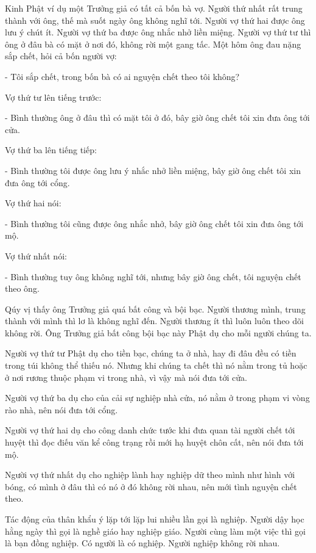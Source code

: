 \documentclass[
  12pt,
  oneside]{book}
\begin{document}
Kinh Phật ví dụ một Trưởng giả có tất cả bốn bà vợ. Người thứ nhất rất trung thành với ông, thế mà suốt ngày ông không nghĩ tới. Người vợ thứ hai được ông lưu ý chút ít. Người vợ thứ ba được ông nhắc nhở liền miệng. Người vợ thứ tư thì ông ở đâu bà có mặt ở nơi đó, không rời một gang tấc. Một hôm ông đau nặng sắp chết, hỏi cả bốn người vợ:

- Tôi sắp chết, trong bốn bà có ai nguyện chết theo tôi không?

Vợ thứ tư lên tiếng trước:

- Bình thường ông ở đâu thì có mặt tôi ở đó, bây giờ ông chết tôi xin đưa ông tới cửa.

Vợ thứ ba lên tiếng tiếp:

- Bình thường tôi được ông lưu ý nhắc nhở liền miệng, bây giờ ông chết tôi xin đưa ông tới cổng.

Vợ thứ hai nói:

- Bình thường tôi cũng được ông nhắc nhở, bây giờ ông chết tôi xin đưa ông tới mộ.

Vợ thứ nhất nói:

- Bình thường tuy ông không nghĩ tới, nhưng bây giờ ông chết, tôi nguyện chết theo ông.

Qúy vị thấy ông Trưởng giả quá bất công và bội bạc. Người thương mình, trung thành với mình thì lơ là không nghĩ đến. Người thương ít thì luôn luôn theo dõi không rời. Ông Trưởng giả bất công bội bạc này Phật dụ cho mỗi người chúng ta.

Người vợ thứ tư Phật dụ cho tiền bạc, chúng ta ở nhà, hay đi đâu đều có tiền trong túi không thể thiếu nó. Nhưng khi chúng ta chết thì nó nằm trong tủ hoặc ở nơi rương thuộc phạm vi trong nhà, vì vậy mà nói đưa tới cửa.

Người vợ thứ ba dụ cho của cải sự nghiệp nhà cửa, nó nằm ở trong phạm vi vòng rào nhà, nên nói đưa tới cổng.

Người vợ thứ hai dụ cho công danh chức tước khi đưa quan tài người chết tới huyệt thì đọc điếu văn kể công trạng rồi mới hạ huyệt chôn cất, nên nói đưa tới mộ.

Người vợ thứ nhất dụ cho nghiệp lành hay nghiệp dữ theo mình như hình với bóng, có mình ở đâu thì có nó ở đó không rời nhau, nên mới tình nguyện chết theo.

Tác động của thân khẩu ý lặp tới lặp lui nhiều lần gọi là nghiệp. Người dậy học hằng ngày thì gọi là nghề giáo hay nghiệp giáo. Người cùng làm một việc thì gọi là bạn đồng nghiệp. Có người là có nghiệp. Người nghiệp không rời nhau.
\end{document}
